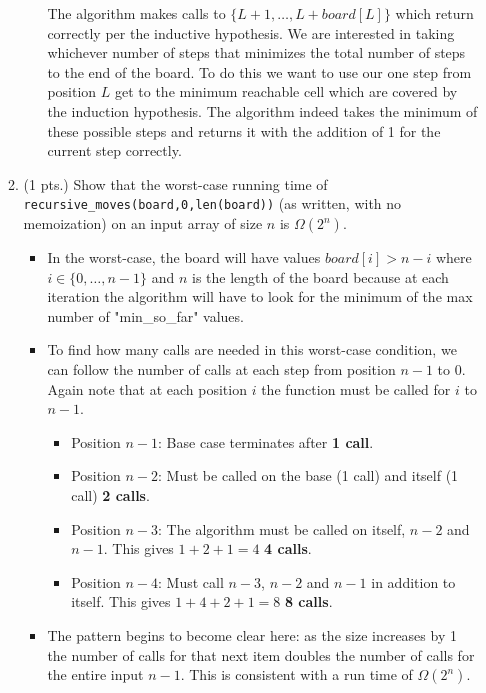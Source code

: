 \documentclass[letterpaper,11pt]{article}
\begin{document}
\begin{enumerate}
\begin{enumerate}
\begin{itemize}
        The algorithm makes calls to $\{L + 1, \ldots, L+board[L]\} $ which return
        correctly per the inductive hypothesis. We are interested in taking 
        whichever number of steps that minimizes the total number of steps 
        to the end of the board. To do this we want to use our one step from
        position $L$ get to the minimum reachable cell which are covered 
        by the induction hypothesis. The algorithm indeed takes the minimum 
        of these possible steps and returns it with the addition of 1
        for the current step correctly.
    \end{itemize}
    


\item (1 pts.) Show that the worst-case running time of
  \texttt{recursive\_moves(board,0,len(board))} (as written, with no
  memoization) on an input array of
  size $n$ is $\Omega(2^n)$.
  \begin{itemize}
      \color{teal}
  \item In the worst-case, the board will have values $board[i] > n - i$ where 
      $i \in \{0, \ldots, n-1\} $ and $n$ is the length of the board because at
      each iteration the algorithm will have to look for the minimum of the max
      number of "min\_so\_far" values. 
  \item To find how many calls are needed in this worst-case condition, we can 
      follow the number of calls at each step from position  $n - 1$ to $0$. 
      Again note that at each position $i$ the function must be called for 
      $i$ to $n - 1$.
      \begin{itemize}
          \item Position $n - 1 $: Base case terminates after \textbf{1 call}. 
          \item Position $n - 2$: Must be called on the base (1 call) and 
              itself (1 call) \textbf{2 calls}.
          \item Position $n - 3$: The algorithm must be called on itself, $n - 2$ and $n - 1$. This gives  $1 + 2 + 1 = 4$ \textbf{4 calls}.
          \item Position $n - 4$: Must call $n - 3$, $n - 2$ and $n - 1$ in 
              addition to itself. This gives $1 + 4 + 2 + 1 = 8$ 
              \textbf{8 calls}.
      \end{itemize}
  \item The pattern begins to become clear here: as the size increases by 1
      the number of calls for that next item doubles the number of calls
      for the entire input $n-1$. This is consistent with a run time of 
      $\Omega\left(  2^{n}\right) $.
  \end{itemize}
  



\end{enumerate}
\end{enumerate}
\end{document}
